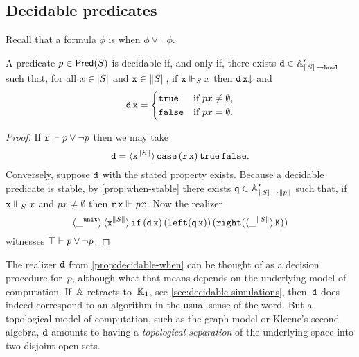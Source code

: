 \subsection{Decidable predicates}
\label{sec:decidable-predicates}

Recall that a formula $\phi$ is  when $\phi \lor \lnot \phi$.

\begin{proposition}
  \label{prop:decidable-when}
  A predicate $p \in \Pred{S}$ is decidable if, and only if, there exists
  $\R{d} \in \subAtyp{\T{S} \to \ttbool}$ such that, for all $x \in \S{S}$ and $\R{x} \in \T{S}$, if $\R{x} \rz[S] x$ then $\defined{\R{d}\,\R{x}}$ and
  \begin{equation*}
    \R{d}\,\R{x} =
    \begin{cases}
      \combTrue & \text{if $p x \neq \emptyset$,} \\
      \combFalse & \text{if $p x = \emptyset$.}
    \end{cases}
  \end{equation*}
\end{proposition}

\begin{proof}
  If $\R{r} \rz p \lor \lnot p$ then we may take
  \begin{equation*}
    \R{d} = \tpcalam{\R{x}}{\T{S}} \combCase\,(\R{r}\,\R{x})\,\combTrue\,\combFalse.
  \end{equation*}
  Conversely, suppose $\R{d}$ with the stated property exists. Because a decidable predicate is stable, by \cref{prop:when-stable} there exists $\R{q} \in \subAtyp{\T{S} \to \T{p}}$ such that, if $\R{x} \rz[S] x$ and $p x \neq \emptyset$ then $\R{r}\,\R{x} \rz p x$. Now the realizer
  \begin{equation*}
    \tpcalam{\_}{\unit}
    \tpcalam{\R{x}}{\T{S}}
      \combIf\,
        (\R{d}\,\R{x})\,
        (\combLeft (\R{q}\,\R{x}))\,
        (\combRight (\tpcalam{\_}{\T{S}}{\combK}))
  \end{equation*}
  witnesses $\top \entails p \lor \lnot p$.
\end{proof}

The realizer $\R{d}$ from \cref{prop:decidable-when} can be thought of as a decision procedure for~$p$, although what that means depends on the underlying model of computation. If~$\AA$ retracts to~$\klone$, see \cref{sec:decidable-simulations}, then~$\R{d}$ does indeed correspond to an algorithm in the usual sense of the word. But a topological model of computation, such as the graph model or Kleene's second algebra, $\R{d}$ amounts to having a \emph{topological separation} of the underlying space into two disjoint open sets.


